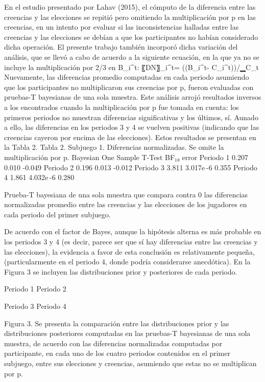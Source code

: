 En el estudio presentado por Lahav (2015), el cómputo de la diferencia entre las creencias y las elecciones se repitió pero omitiendo la multiplicación por p en las creencias, en un intento por evaluar si las inconsistencias halladas entre las creencias y las elecciones se debían a que los participantes no habían considerado dicha operación. El presente trabajo también incorporó dicha variación del análisis, que se llevó a cabo de acuerdo a la siguiente ecuación, en la que ya no se incluye la multiplicación por 2/3 en B_i^t:
〖DN〗_i^t=  ((B_i^t- C_i^t))/▁C_t 
Nuevamente, las diferencias promedio computadas en cada periodo asumiendo que los participantes no multiplicaron sus creencias por p, fueron evaluadas con pruebas-T bayesianas de una sola muestra.  Este análisis arrojó resultados inversos a los encontrados cuando la multiplicación por p fue tomada en cuenta: los primeros periodos no muestran diferencias significativas y los últimos, sí.  Aunado a ello, las diferencias en los periodos 3 y 4 se vuelven positivas (indicando que las creencias cayeron por encima de las elecciones). Estos resultados se presentan en la Tabla 2.
Tabla 2. Subjuego 1. Diferencias normalizadas. Se omite la multiplicación por p.
Bayesian One Sample T-Test 	
  	BF₁₀ 	error %
Periodo 1 		0.207 		0.010 		-0.049 
Periodo 2 		0.196 		0.013 		-0.012 
Periodo 3 		3.811 		3.017e -6 		0.355 
Periodo 4 		1.861 		4.032e -6 		0.280 
	
Prueba-T bayesiana de una sola muestra que compara contra 0 las diferencias normalizadas promedio entre las creencias y las elecciones de los jugadores en cada periodo del primer subjuego.

De acuerdo con el factor de Bayes, aunque la hipótesis alterna es más probable en los periodos 3 y 4 (es decir, parece ser que sí hay diferencias entre las creencias y las elecciones), la evidencia a favor de esta conclusión es relativamente pequeña, (particularmente en el periodo 4, donde podría considerarse anecdótica). En la Figura 3 se incluyen las distribuciones prior y posteriores de cada periodo.


  
Periodo 1					Periodo 2
  
Periodo 3					Periodo 4

Figura 3. Se presenta la comparación entre las distribuciones prior y las distribuciones posteriores computadas en las pruebas-T bayesianas de una sola muestra, de acuerdo con las diferencias normalizadas computadas por participante, en cada uno de los cuatro periodos contenidos en el primer subjuego, entre sus elecciones y creencias, asumiendo que estas no se multiplican por p.


